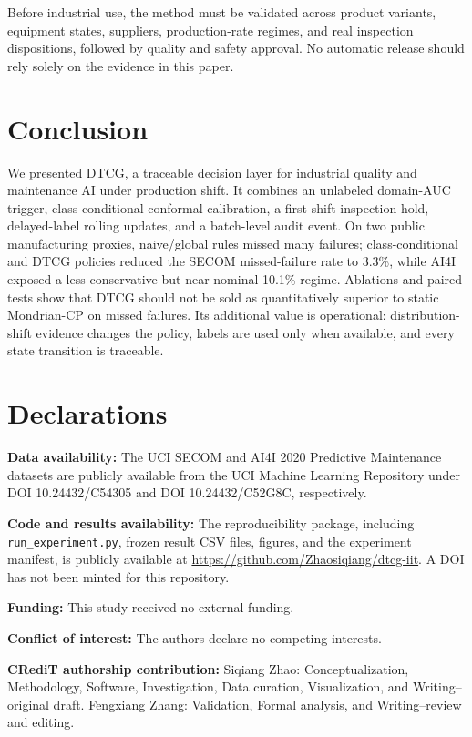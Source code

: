 \documentclass[journal]{IEEEtran}
\begin{document}
{\raggedright Before industrial use, the method must be validated across product variants, equipment states, suppliers, production-rate regimes, and real inspection dispositions, followed by quality and safety approval. No automatic release should rely solely on the evidence in this paper.\par}

\section{Conclusion}
\label{sec:conclusion}
We presented DTCG, a traceable decision layer for industrial quality and maintenance AI under production shift. It combines an unlabeled domain-AUC trigger, class-conditional conformal calibration, a first-shift inspection hold, delayed-label rolling updates, and a batch-level audit event. On two public manufacturing proxies, naive/global rules missed many failures; class-conditional and DTCG policies reduced the SECOM missed-failure rate to 3.3\%, while AI4I exposed a less conservative but near-nominal 10.1\% regime. Ablations and paired tests show that DTCG should not be sold as quantitatively superior to static Mondrian-CP on missed failures. Its additional value is operational: distribution-shift evidence changes the policy, labels are used only when available, and every state transition is traceable.

\section*{Declarations}
\textbf{Data availability:} The UCI SECOM and AI4I 2020 Predictive Maintenance datasets are publicly available from the UCI Machine Learning Repository under DOI 10.24432/C54305 and DOI 10.24432/C52G8C, respectively.

\textbf{Code and results availability:} The reproducibility package, including \texttt{run\_experiment.py}, frozen result CSV files, figures, and the experiment manifest, is publicly available at \url{https://github.com/Zhaosiqiang/dtcg-iit}. A DOI has not been minted for this repository.

\textbf{Funding:} This study received no external funding.

\textbf{Conflict of interest:} The authors declare no competing interests.

\textbf{CRediT authorship contribution:} Siqiang Zhao: Conceptualization, Methodology, Software, Investigation, Data curation, Visualization, and Writing--original draft. Fengxiang Zhang: Validation, Formal analysis, and Writing--review and editing.
\end{document}
